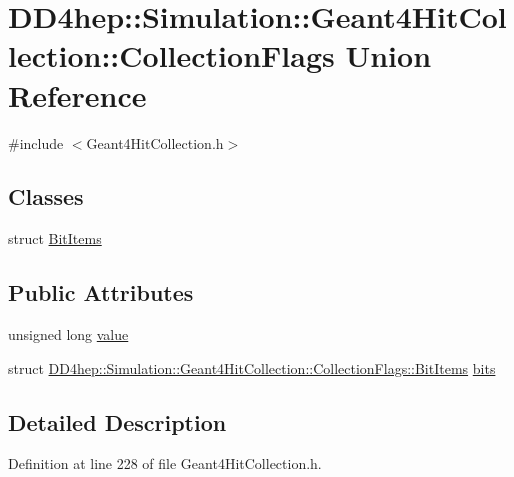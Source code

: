 \hypertarget{union_d_d4hep_1_1_simulation_1_1_geant4_hit_collection_1_1_collection_flags}{
\section{DD4hep::Simulation::Geant4HitCollection::CollectionFlags Union Reference}
\label{union_d_d4hep_1_1_simulation_1_1_geant4_hit_collection_1_1_collection_flags}
}


{\ttfamily \#include $<$Geant4HitCollection.h$>$}\subsection*{Classes}
\begin{DoxyCompactItemize}
\item 
struct \hyperlink{struct_d_d4hep_1_1_simulation_1_1_geant4_hit_collection_1_1_collection_flags_1_1_bit_items}{BitItems}
\end{DoxyCompactItemize}
\subsection*{Public Attributes}
\begin{DoxyCompactItemize}
\item 
unsigned long \hyperlink{union_d_d4hep_1_1_simulation_1_1_geant4_hit_collection_1_1_collection_flags_a41662e93df084e0be2823219e1b09934}{value}
\item 
struct \hyperlink{struct_d_d4hep_1_1_simulation_1_1_geant4_hit_collection_1_1_collection_flags_1_1_bit_items}{DD4hep::Simulation::Geant4HitCollection::CollectionFlags::BitItems} \hyperlink{union_d_d4hep_1_1_simulation_1_1_geant4_hit_collection_1_1_collection_flags_af42792808f44426300dfd74c4dac5d89}{bits}
\end{DoxyCompactItemize}


\subsection{Detailed Description}


Definition at line 228 of file Geant4HitCollection.h.

